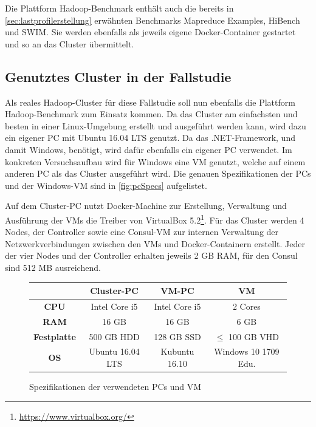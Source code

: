 Die Plattform Hadoop-Benchmark enthält auch die bereits in \autoref{sec:lastprofilerstellung} erwähnten Benchmarks Mapreduce Examples, HiBench und SWIM. Sie werden ebenfalls als jeweils eigene Docker-Container gestartet und so an das Cluster übermittelt.

\subsection{Genutztes Cluster in der Fallstudie}\label{sec:clusterFallstudie}

Als reales Hadoop-Cluster für diese Fallstudie soll nun ebenfalls die Plattform Hadoop-Benchmark zum Einsatz kommen. Da das Cluster am einfachsten und besten in einer Linux-Umgebung erstellt und ausgeführt werden kann, wird dazu ein eigener PC mit Ubuntu 16.04 LTS genutzt. Da \sS das .NET-Framework, und damit Windows, benötigt, wird dafür ebenfalls ein eigener PC verwendet. Im konkreten Versuchsaufbau wird für Windows eine VM genutzt, welche auf einem anderen PC als das Cluster ausgeführt wird. Die genauen Spezifikationen der PCs und der Windows-VM sind in \autoref{fig:pcSpecs} aufgelistet.

Auf dem Cluster-PC nutzt Docker-Machine zur Erstellung, Verwaltung und Ausführung der VMs die Treiber von VirtualBox 5.2\footnote{\url{https://www.virtualbox.org/}}. Für das Cluster werden 4 Nodes, der Controller sowie eine Consul-VM zur internen Verwaltung der Netzwerkverbindungen zwischen den VMs und Docker-Containern erstellt. Jeder der vier Nodes und der Controller erhalten jeweils 2 GB RAM, für den Consul sind 512 MB ausreichend.

\begin{figure}
    \centering
    \begin{tabular}{|c|c|c|c|}
    	\hline
    	     \textbf{}      & \textbf{Cluster-PC} & \textbf{VM-PC} &     \textbf{VM}      \\ \hline\hline
    	   \textbf{CPU}     &    Intel Core i5    & Intel Core i5  &       2 Cores        \\ \hline
    	   \textbf{RAM}     &        16 GB        &     16 GB      &         6 GB         \\ \hline
    	\textbf{Festplatte} &     500 GB HDD      &   128 GB SSD   &  $\leq$ 100 GB VHD   \\ \hline
    	    \textbf{OS}     &  Ubuntu 16.04 LTS   & Kubuntu 16.10  & Windows 10 1709 Edu. \\ \hline
    \end{tabular}
    \caption{Spezifikationen der verwendeten PCs und VM}
    \label{fig:pcSpecs}
\end{figure}

